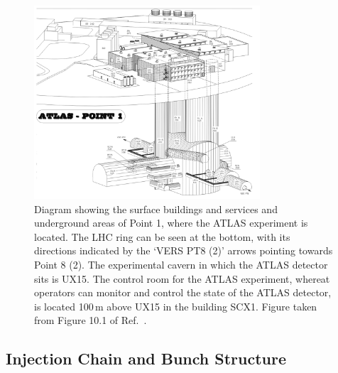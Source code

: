 \begin{figure}[!htb]
    \begin{center}
        \includegraphics[width=0.75\textwidth]{figures/chapter2/point1_illustration}
        \caption{
            Diagram showing the surface buildings and services and underground areas of Point 1, where
            the ATLAS experiment is located. The LHC ring can be seen at the bottom,
            with its directions indicated by the `VERS PT8 (2)' arrows pointing
            towards Point 8 (2).
            The experimental cavern in which the ATLAS detector sits is UX15.
            The control room for the ATLAS experiment, whereat operators can monitor and
            control the state of the ATLAS detector, is located 100\,m above
            UX15 in the building SCX1.
            Figure taken from Figure 10.1 of Ref.~\cite{LHCDesignII}.
        }
        \label{fig:p1}
    \end{center}
\end{figure}

\subsection{Injection Chain and Bunch Structure}
\label{sec:lhc_injection}

